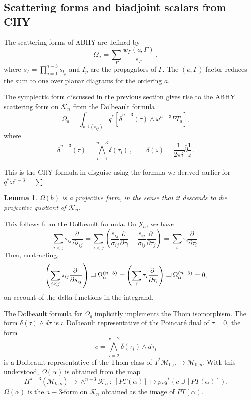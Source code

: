 \documentclass[11pt]{article}
\newcommand{\p}{\partial}
\newcommand{\cK}{\mathcal{K}}
\newcommand{\cM}{\mathcal{M}}
\newcommand{\cY}{\mathcal{Y}}
\newcommand{\bt}{\underline{\tau}}
\newcommand{\1}{{\rm 1\hskip-0.25em I}}
\newcommand{\proof}{ \noindent {\bf Proof:} }
\newtheorem{lemma}{Lemma}[section]
\newcommand{\hook}{{\setlength{\unitlength}{10pt}		%
                  ~ \begin{picture}(.833,.8)
                   \put(-.18,.08){\line(1,0){.7}}
                   \put(.5,.08){\line(0,1){.5}}
                   \end{picture}}}
\begin{document}
 



\subsection{Scattering forms and  biadjoint scalars from CHY}


The scattering forms of ABHY are defined by 
\begin{equation}
\Omega_a=\sum_{\Gamma}\frac{w_\Gamma  (a,\Gamma)}{s_\Gamma} \, ,
\end{equation}
where $s_\Gamma=\prod_{p=1}^{n-3} s_{I_p}$ and  $I_p$ are the propagators of $\Gamma$. The $(a,\Gamma)$-factor reduces the sum to one  over planar diagrams for the ordering $a$.



The symplectic form discussed in the previous section gives rise to the ABHY scattering form on $\cK_n$ from the Dolbeault formula 
\begin{equation}
\Omega_a = \int_{p^{-1}(s_{ij})} q^* \left[ \bar\delta^{n-3}(\bt) \wedge \omega^{n-3} PT_a \right],
\end{equation}
where 
\begin{equation}
\bar\delta^{n-3}(\bt)=\bigwedge_{i=1}^{n-3} \bar\delta(\tau_i)\, , \qquad \bar \delta(z)=\frac{1}{2\pi i} \bar\p\frac{1}{z}\, .
\end{equation} 


This is the CHY formula in disguise using the formula we derived earlier for $q^*\omega^{n-3}=\sum$.

\begin{lemma}
 $\Omega(b)$ is a projective form, in the sense that it descends to the projective quotient of $\cK_n$.
 \end{lemma}
 \proof This follows from the Dolbeault formula. On $\cY_n$, we have
$$
\sum_{i<j}s_{ij}\frac{\p~}{\p s_{ij}} = \sum_{i<j} \left(\frac{s_{ij}}{\sigma_{ij}}\frac{\p~}{\p\tau_i} - \frac{s_{ij}}{\sigma_{ij}}\frac{\p~}{\p\tau_j}\right) = \sum_i \tau_i \frac{\p~}{\p\tau_i}.
$$
Then, contracting,
$$
\left(\sum_{i<j}s_{ij}\frac{\p~}{\p s_{ij}}\right)\hook \Omega_{\alpha}^{(n-3)} = \left(\sum_i \tau_i \frac{\p~}{\p\tau_i}\right)\hook \Omega_{\alpha}^{(n-3)} = 0,
$$
on account of the delta functions in the integrand.

The Dolbeault formula for $\Omega_a$ implicitly implements the Thom isomorphism. The form $\bar\delta(\tau)\wedge d\tau$ is a Dolbeault representative of the Poincar\'e dual of $\tau = 0$, the form
$$
c = \bigwedge_{i=2}^{n-2} \bar\delta(\tau_i) \wedge d\tau_i
$$
is a Dolbeault representative of the Thom class of $T^*\cM_{0,n}\rightarrow \cM_{0,n}$. With this understood, $\Omega(\alpha)$ is obtained from the map
$$
H^{n-3}(\cM_{0,n}) \rightarrow \wedge^{n-3}\cK_n ~:~ [PT(\alpha)] \mapsto p_* q^* \left(c \cup [PT(\alpha)]\right).
$$
$\Omega(\alpha)$ is the $n-3$-form on $\cK_n$ obtained as the image of $PT(\alpha)$.
\end{document}
